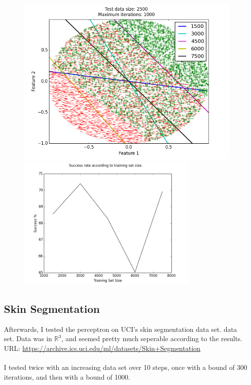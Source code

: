 \documentclass[a4paper]{article}
\begin{document}
\begin{figure}[h!]
    \includegraphics[width=1.0\textwidth]{images/inseperable.png}
    \includegraphics[width=0.8\textwidth]{images/success_rate.png}
\end{figure}

\newpage

\subsection {Skin Segmentation}

Afterwards, I tested the perceptron on UCI's skin segmentation data set.
data set.
Data was in $\mathbb{R}^3$, and seemed pretty much seperable according to the results.
\\
URL: \url{https://archive.ics.uci.edu/ml/datasets/Skin+Segmentation}
\\
\\
I tested twice with an increasing data set over 10 steps,
once with a bound of 300 iterations, and then with a bound of 1000.
\end{document}
